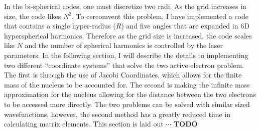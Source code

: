 In the bi-spherical codes, one must discretize two radi. As the grid increases in size, the code likes $N^2$. To cercomvent this problem, I have implemented a code that contains a single hyper-radius ($R$) and five angles that are expanded in 6D hyperspherical harmonics. Therefore as the grid size is increased, the code scales like $N$ and the number of spherical harmonics is controlled by the laser parameters. In the following section, I will describe the details to implementing two different ``coordinate systems'' that solve the two active electron problem. The first is through the use of Jacobi Coordinates, which allows for the finite mass of the nucleus to be accounted for. The second is making the infinite mass approximation for the nucleus allowing for the distance between the two electrons to be accessed more directly. The two problems can be solved with similar sized wavefunctions, however, the second method has a greatly reduced time in calculating matrix elements. This section is laid out $\cdots$ \textbf{TODO}

